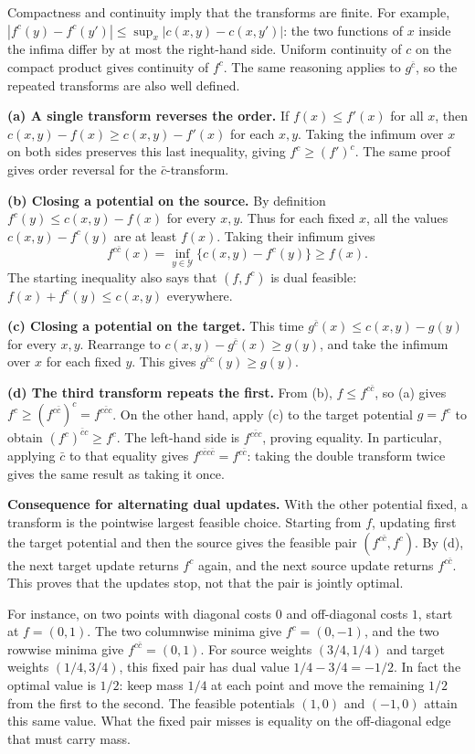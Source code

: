 \documentclass[11pt,a4paper]{article}
\theoremstyle{exostyle}
\newcommand{\Y}{\mathcal Y}
\begin{document}
\begin{solution}
Compactness and continuity imply that the transforms are finite.
For example,
$|f^c(y)-f^c(y')|\le\sup_x |c(x,y)-c(x,y')|$: the two functions
of $x$ inside the infima differ by at most the right-hand side.
Uniform continuity of $c$ on the compact product gives continuity of
$f^c$. The same reasoning applies to $g^{\bar c}$, so the repeated
transforms are also well defined.

\textbf{(a) A single transform reverses the order.}
If $f(x)\le f'(x)$ for all $x$, then
$c(x,y)-f(x)\ge c(x,y)-f'(x)$ for each $x,y$.
Taking the infimum over $x$ on both sides preserves this last
inequality, giving $f^c\ge(f')^c$. The same proof gives order reversal
for the $\bar c$-transform.

\textbf{(b) Closing a potential on the source.}
By definition $f^c(y)\le c(x,y)-f(x)$ for every $x,y$. Thus for each
fixed $x$, all the values $c(x,y)-f^c(y)$ are at least $f(x)$.
Taking their infimum gives
\[
  f^{c\bar c}(x)=\inf_{y\in\Y}\{c(x,y)-f^c(y)\}\ge f(x).
\]
The starting inequality also says that $(f,f^c)$ is dual feasible:
$f(x)+f^c(y)\le c(x,y)$ everywhere.

\textbf{(c) Closing a potential on the target.}
This time $g^{\bar c}(x)\le c(x,y)-g(y)$ for every $x,y$.
Rearrange to $c(x,y)-g^{\bar c}(x)\ge g(y)$, and take the infimum
over $x$ for each fixed $y$. This gives $g^{\bar c c}(y)\ge g(y)$.

\textbf{(d) The third transform repeats the first.}
From (b), $f\le f^{c\bar c}$, so (a) gives
$f^c\ge(f^{c\bar c})^c=f^{c\bar c c}$.
On the other hand, apply (c) to the target potential $g=f^c$ to
obtain $(f^c)^{\bar c c}\ge f^c$. The left-hand side is
$f^{c\bar c c}$, proving equality. In particular, applying $\bar c$
to that equality gives $f^{c\bar c c\bar c}=f^{c\bar c}$: taking the
double transform twice gives the same result as taking it once.

\par{}
\textbf{Consequence for alternating dual updates.}
With the other potential fixed, a transform is the pointwise
largest feasible choice. Starting from $f$, updating first the target
potential and then the source gives the feasible pair
$(f^{c\bar c},f^c)$. By (d), the next target update returns $f^c$ again,
and the next source update returns $f^{c\bar c}$. This proves that
the updates stop, not that the pair is jointly optimal.

For instance, on two points with diagonal costs $0$ and off-diagonal
costs $1$, start at $f=(0,1)$. The two columnwise minima give
$f^c=(0,-1)$, and the two rowwise minima give $f^{c\bar c}=(0,1)$.
For source weights $(3/4,1/4)$ and target weights $(1/4,3/4)$, this
fixed pair has dual value $1/4-3/4=-1/2$. In fact the optimal value
is $1/2$: keep mass $1/4$ at each point and move the remaining $1/2$
from the first to the second. The feasible potentials $(1,0)$ and
$(-1,0)$ attain this same value. What the fixed pair misses is
equality on the off-diagonal edge that must carry mass.
\end{solution}
\end{document}
